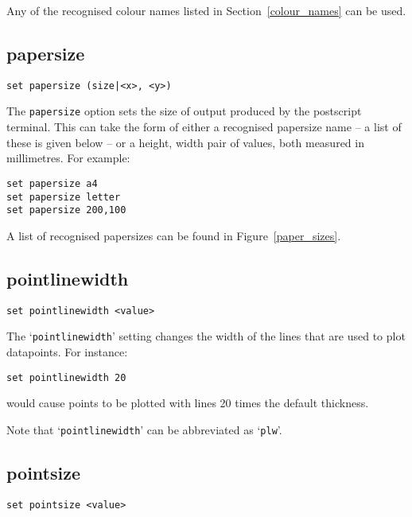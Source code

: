 Any of the recognised colour names listed in Section~\ref{colour_names} can be used.

\subsection{papersize}

\begin{verbatim}
set papersize (size|<x>, <y>)
\end{verbatim}

The {\tt papersize} option sets the size of output produced by the postscript
terminal. This can take the form of either a recognised papersize name -- a
list of these is given below -- or a height, width pair of values, both measured
in millimetres. For example:

\begin{verbatim}
set papersize a4
set papersize letter
set papersize 200,100
\end{verbatim}

A list of recognised papersizes can be found in Figure~\ref{paper_sizes}.

\subsection{pointlinewidth}

\begin{verbatim}
set pointlinewidth <value>
\end{verbatim}

The `{\tt pointlinewidth}' setting changes the width of the lines that are used to
plot datapoints.  For instance:

\begin{verbatim}
set pointlinewidth 20
\end{verbatim}

\noindent would cause points to be plotted with lines 20 times the default thickness.

Note that `{\tt pointlinewidth}' can be abbreviated as `{\tt plw}'.

\subsection{pointsize}

\begin{verbatim}
set pointsize <value>
\end{verbatim}

